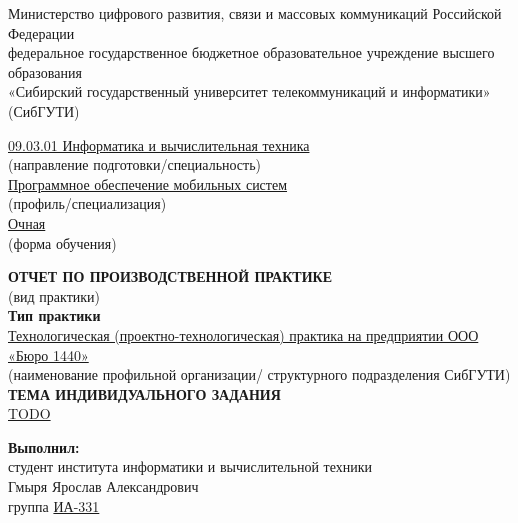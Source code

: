 
\begin{center}
Министерство цифрового развития, связи и массовых коммуникаций Российской Федерации\\
федеральное государственное бюджетное образовательное учреждение высшего образования\\
«Сибирский государственный университет телекоммуникаций и информатики»\\
(СибГУТИ)
\end{center}

\vspace{0.6cm}

\begin{flushright}
\underline{09.03.01 Информатика и вычислительная техника}\\
{\footnotesize (направление подготовки/специальность)}\\[0.3em]
\underline{Программное обеспечение мобильных систем}\\
{\footnotesize (профиль/специализация)}\\[0.3em]
\underline{Очная}\\
{\footnotesize (форма обучения)}
\end{flushright}

\vspace{1cm}

\begin{center}
\textbf{ОТЧЕТ ПО ПРОИЗВОДСТВЕННОЙ ПРАКТИКЕ}\\[0.2em]
{\footnotesize (вид практики)}\\[0.7em]

\textbf{Тип практики}\\[0.4em]
\underline{Технологическая (проектно-технологическая) практика на предприятии ООО «Бюро 1440»}\\
{\footnotesize (наименование профильной организации/ структурного подразделения СибГУТИ)}\\[1em]

\textbf{ТЕМА ИНДИВИДУАЛЬНОГО ЗАДАНИЯ}\\[0.3em]
\underline{TODO}
\end{center}

\vspace{0.5cm}

\begin{flushright}
\textbf{Выполнил:}\\[0.2em]
студент института информатики и вычислительной техники\\
Гмыря Ярослав Александрович\\
группа \underline{ИА-331}
\end{flushright}

